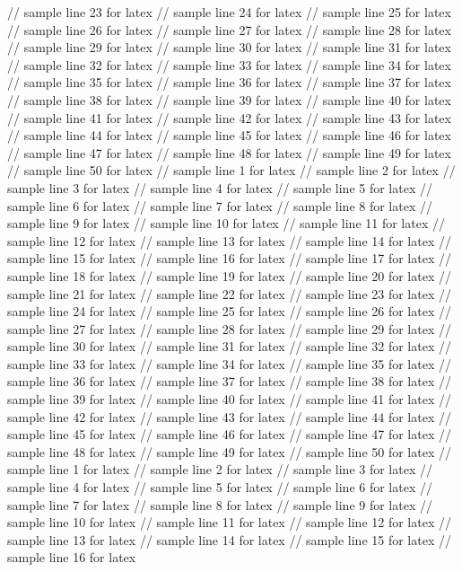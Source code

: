 // sample line 23 for latex
// sample line 24 for latex
// sample line 25 for latex
// sample line 26 for latex
// sample line 27 for latex
// sample line 28 for latex
// sample line 29 for latex
// sample line 30 for latex
// sample line 31 for latex
// sample line 32 for latex
// sample line 33 for latex
// sample line 34 for latex
// sample line 35 for latex
// sample line 36 for latex
// sample line 37 for latex
// sample line 38 for latex
// sample line 39 for latex
// sample line 40 for latex
// sample line 41 for latex
// sample line 42 for latex
// sample line 43 for latex
// sample line 44 for latex
// sample line 45 for latex
// sample line 46 for latex
// sample line 47 for latex
// sample line 48 for latex
// sample line 49 for latex
// sample line 50 for latex
// sample line 1 for latex
// sample line 2 for latex
// sample line 3 for latex
// sample line 4 for latex
// sample line 5 for latex
// sample line 6 for latex
// sample line 7 for latex
// sample line 8 for latex
// sample line 9 for latex
// sample line 10 for latex
// sample line 11 for latex
// sample line 12 for latex
// sample line 13 for latex
// sample line 14 for latex
// sample line 15 for latex
// sample line 16 for latex
// sample line 17 for latex
// sample line 18 for latex
// sample line 19 for latex
// sample line 20 for latex
// sample line 21 for latex
// sample line 22 for latex
// sample line 23 for latex
// sample line 24 for latex
// sample line 25 for latex
// sample line 26 for latex
// sample line 27 for latex
// sample line 28 for latex
// sample line 29 for latex
// sample line 30 for latex
// sample line 31 for latex
// sample line 32 for latex
// sample line 33 for latex
// sample line 34 for latex
// sample line 35 for latex
// sample line 36 for latex
// sample line 37 for latex
// sample line 38 for latex
// sample line 39 for latex
// sample line 40 for latex
// sample line 41 for latex
// sample line 42 for latex
// sample line 43 for latex
// sample line 44 for latex
// sample line 45 for latex
// sample line 46 for latex
// sample line 47 for latex
// sample line 48 for latex
// sample line 49 for latex
// sample line 50 for latex
// sample line 1 for latex
// sample line 2 for latex
// sample line 3 for latex
// sample line 4 for latex
// sample line 5 for latex
// sample line 6 for latex
// sample line 7 for latex
// sample line 8 for latex
// sample line 9 for latex
// sample line 10 for latex
// sample line 11 for latex
// sample line 12 for latex
// sample line 13 for latex
// sample line 14 for latex
// sample line 15 for latex
// sample line 16 for latex
